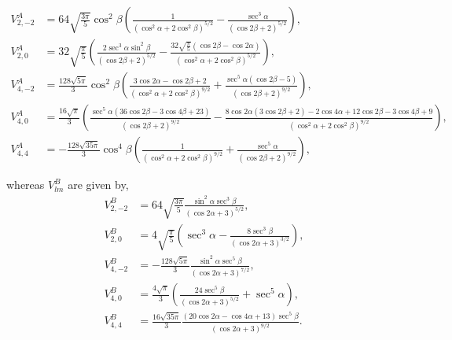 \documentclass[a4paper,prb,twocolumn]{revtex4-1}  %
\newcommand{\rev}[1]{{\color{blue}{#1}}}
\newcommand{\az}[1]{{\color{magenta}{#1}}} %
\begin{document}
\begin{widetext}
\begin{align}
V^A_{2,-2}&= 64 \sqrt{\frac{3 \pi }{5}} \cos ^2\beta  \left(\frac{1}{\left(\cos ^2\alpha +2 \cos ^2\beta \right)^{5/2}}-\frac{\sec ^3\alpha }{(\cos 2 \beta +2)^{5/2}}\right),\\
V^A_{2,0}&= 32 \sqrt{\frac{\pi }{5}} \left(\frac{2 \sec ^3\alpha  \sin ^2\beta }{(\cos 2 \beta +2)^{5/2}}-\frac{32 \sqrt{\frac{\pi }{5}} (\cos 2 \beta -\cos 2 \alpha )}{\left(\cos ^2\alpha +2 \cos ^2\beta \right)^{5/2}}\right),\\
V^A_{4,-2}&= \frac{128\sqrt{5 \pi } }{3} \cos ^2\beta  \left(\frac{3 \cos 2 \alpha -\cos 2 \beta +2}{\left(\cos ^2\alpha +2 \cos ^2\beta \right)^{9/2}}+\frac{\sec ^5\alpha  (\cos 2 \beta -5)}{(\cos 2 \beta +2)^{9/2}}\right),\\ \nonumber
V^A_{4,0}&= \frac{16\sqrt{\pi } }{3} \left(
\frac{\sec ^5\alpha  (36 \cos 2 \beta -3 \cos 4 \beta +23)}{(\cos 2 \beta +2)^{9/2}}
-
\frac{8 \cos 2 \alpha  (3 \cos 2 \beta +2)-2 \cos 4 \alpha+12 \cos 2 \beta -3 \cos 4 \beta +9}{\left(\cos ^2\alpha +2 \cos ^2\beta \right)^{9/2}}
\right),\\
V^A_{4,4}&=-\frac{128\sqrt{35 \pi } }{3} \cos ^4\beta  \left(\frac{1}{\left(\cos ^2\alpha +2 \cos ^2\beta \right)^{9/2}}+\frac{\sec ^5\alpha }{(\cos 2 \beta +2)^{9/2}}\right),
\end{align}
\end{widetext}
whereas $V_{lm}^{B}$ are given by,
\begin{align}
V^{B}_{2,-2}&= 64 \sqrt{\frac{3 \pi }{5}}  \frac{\sin ^2\alpha  \sec ^3\beta }{(\cos 2 \alpha +3)^{5/2}},
 \\ V^{B}_{2,0}&=  4 \sqrt{\frac{\pi }{5}} \left(\sec ^3\alpha -\frac{8 \sec ^3\beta }{(\cos 2 \alpha +3)^{3/2}}\right),\\
 V^{B}_{4,-2}&=  - \frac{128 \sqrt{5 \pi } }{3} \frac{\sin ^2\alpha  \sec ^5\beta }{ (\cos 2 \alpha +3)^{7/2}},\\ 
V^{B}_{4,0}&= \frac{4\sqrt{\pi } }{3} \left(\frac{24 \sec ^5\beta }{(\cos 2 \alpha +3)^{5/2}}+\sec ^5\alpha \right),\\
 V^{B}_{4,4}&=  \frac{16 \sqrt{35 \pi } }{3} \frac{(20 \cos 2 \alpha -\cos 4 \alpha +13) 
 \sec ^5\beta }
 {(\cos 2 \alpha +3)^{9/2}}.
 \end{align}
\end{document}
